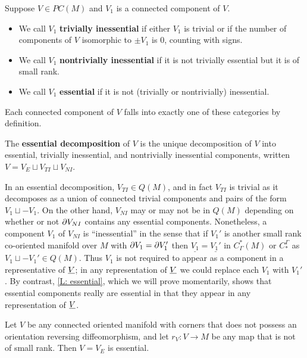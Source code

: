 \begin{definition}\label{D: essential}
Suppose $V\in PC(M)$ and $V_1$ is a connected component of $V$.
\begin{itemize}
\item We call $V_1$  \textbf{trivially inessential} if either
$V_1$ is trivial or if the number of components of
$V$ isomorphic to $\pm V_1$ is $0$,  counting with signs.

\item We call ${V_1}$ \textbf{nontrivially inessential} if it is not trivially essential but it is of small rank.

\item We call ${V_1}$ \textbf{essential} if it is not  (trivially or nontrivially) inessential.
\end{itemize}

Each connected component of $V$ falls into exactly one of these categories by definition.

The {\bf essential decomposition} of $V$ is the unique decomposition of $V$ into essential, trivially inessential, and nontrivially inessential components,
written $V=V_E\sqcup V_{TI}\sqcup V_{NI}$.
\end{definition}

In an essential decomposition,  $V_{TI}\in Q(M)$, and in fact $V_{TI}$ is trivial as it decomposes as a union of connected trivial components and pairs of the form $V_1\sqcup -V_1$. On the other hand, $V_{NI}$ may or may not be in $Q(M)$ depending on whether or not $\partial V_{NI}$
contains any essential components. Nonetheless, a component  $V_1$ of $V_{NI}$ is ``inessential'' in the sense that if $V_1'$ is another small rank co-oriented manifold over $M$ with $\partial V_1=\partial V_1'$ then $\underline{V_1}=\underline{V_1'}$ in $C_\Gamma^*(M)$ or $C_*^\Gamma$ as $V_1\sqcup -V_1'\in Q(M)$. Thus $V_1$ is not required to appear as a component in a representative of $\underline{V}$; in any representation of $\underline{V}$ we could replace each $V_1$ with $V_1'$. By contrast, \cref{L: essential}, which we will prove momentarily, shows that essential components really are essential in that they appear in any representation of $\underline{V}$.


\begin{example}
Let $V$ be any connected oriented manifold with corners that does not possess an orientation reversing diffeomorphism, and let $r_V:V\to M$ be any map that is not of small rank. Then $V=V_E$ is essential.
\end{example}


